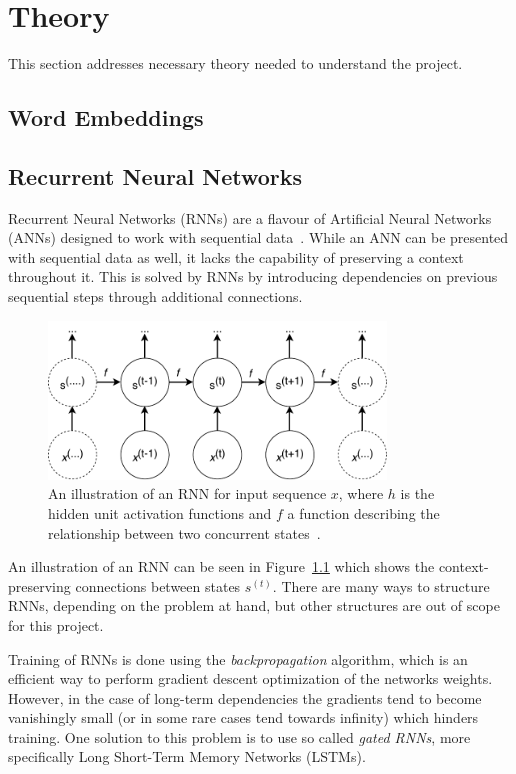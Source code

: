 \chapter{Theory}
This section addresses necessary theory needed to understand the project.

\section{Word Embeddings}

\section{Recurrent Neural Networks}
Recurrent Neural Networks (RNNs) are a flavour of Artificial Neural Networks (ANNs) designed to work with sequential data~\cite{goodfellow2016deep}. While an ANN can be presented with sequential data as well, it lacks the capability of preserving a context throughout it. This is solved by RNNs by introducing dependencies on previous sequential steps through additional connections.
\begin{figure}[H]
  \centering
  \includegraphics[width=0.8\textwidth]{graphics/rnn}
  \caption{An illustration of an RNN for input sequence $x$, where $h$ is the hidden unit activation functions and $f$ a function describing the relationship between two concurrent states~\cite{goodfellow2016deep}.}\label{fig:rnn}
\end{figure}
An illustration of an RNN can be seen in Figure~\ref{fig:rnn} which shows the context-preserving connections between states $s^{(t)}$. There are many ways to structure RNNs, depending on the problem at hand, but other structures are out of scope for this project.

Training of RNNs is done using the \textit{backpropagation} algorithm, which is an efficient way to perform gradient descent optimization of the networks weights. However, in the case of long-term dependencies the gradients tend to become vanishingly small (or in some rare cases tend towards infinity) which hinders training. One solution to this problem is to use so called \textit{gated RNNs}, more specifically Long Short-Term Memory Networks (LSTMs).

